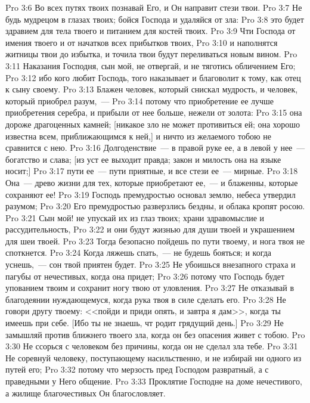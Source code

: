 \vs Pro 3:6 Во всех путях твоих познавай Его, и Он направит стези твои.
\vs Pro 3:7 Не будь мудрецом в глазах твоих; бойся Господа и удаляйся от зла:
\vs Pro 3:8 это будет здравием для тела твоего и питанием для костей твоих.
\vs Pro 3:9 Чти Господа от имения твоего и от начатков всех прибытков твоих,
\vs Pro 3:10 и наполнятся житницы твои до избытка, и точила твои будут переливаться новым вином.
\rsbpar\vs Pro 3:11 Наказания Господня, сын мой, не отвергай, и не тяготись обличением Его;
\vs Pro 3:12 ибо кого любит Господь, того наказывает и благоволит к тому, как отец к сыну своему.
\vs Pro 3:13 Блажен человек, который снискал мудрость, и человек, который приобрел разум,~---
\vs Pro 3:14 потому что приобретение ее лучше приобретения серебра, и прибыли от нее больше, нежели от золота:
\vs Pro 3:15 она дороже драгоценных камней; [никакое зло не может противиться ей; она хорошо известна всем, приближающимся к ней,] и ничто из желаемого тобою не сравнится с нею.
\vs Pro 3:16 Долгоденствие~--- в правой руке ее, а в левой у нее~--- богатство и слава; [из уст ее выходит правда; закон и милость она на языке носит;]
\vs Pro 3:17 пути ее~--- пути приятные, и все стези ее~--- мирные.
\vs Pro 3:18 Она~--- древо жизни для тех, которые приобретают ее,~--- и блаженны, которые сохраняют ее!
\rsbpar\vs Pro 3:19 Господь премудростью основал землю, небеса утвердил разумом;
\vs Pro 3:20 Его премудростью разверзлись бездны, и облака кропят росою.
\vs Pro 3:21 Сын мой! не упускай их из глаз твоих; храни здравомыслие и рассудительность,
\vs Pro 3:22 и они будут жизнью для души твоей и украшением для шеи твоей.
\vs Pro 3:23 Тогда безопасно пойдешь по пути твоему, и нога твоя не споткнется.
\vs Pro 3:24 Когда ляжешь спать,~--- не будешь бояться; и когда уснешь,~--- сон твой приятен будет.
\vs Pro 3:25 Не убоишься внезапного страха и пагубы от нечестивых, когда она придет;
\vs Pro 3:26 потому что Господь будет упованием твоим и сохранит ногу твою от уловления.
\rsbpar\vs Pro 3:27 Не отказывай в благодеянии нуждающемуся, когда рука твоя в силе сделать его.
\vs Pro 3:28 Не говори другу твоему: <<пойди и приди опять, и завтра я дам>>, когда ты имеешь при себе. [Ибо ты не знаешь, чт родит грядущий день.]
\vs Pro 3:29 Не замышляй против ближнего твоего зла, когда он без опасения живет с тобою.
\vs Pro 3:30 Не ссорься с человеком без причины, когда он не сделал зла тебе.
\vs Pro 3:31 Не соревнуй человеку, поступающему насильственно, и не избирай ни одного из путей его;
\vs Pro 3:32 потому что мерзость пред Господом развратный, а с праведными у Него общение.
\vs Pro 3:33 Проклятие Господне на доме нечестивого, а жилище благочестивых Он благословляет.

